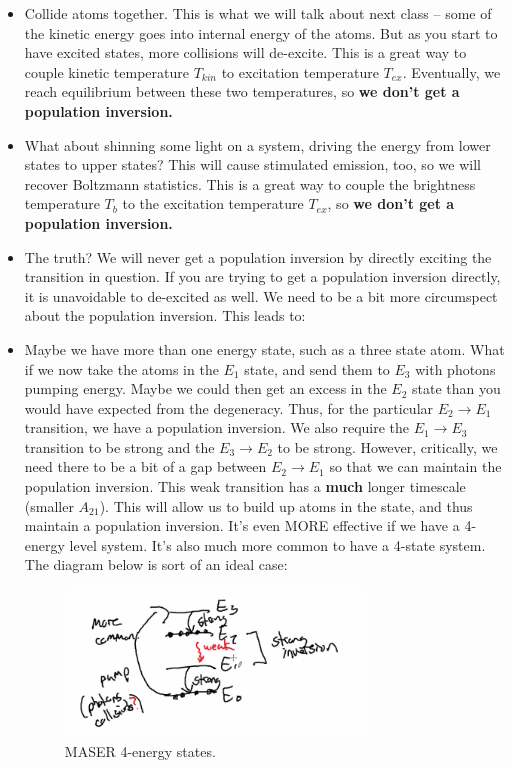 \documentclass{article}
\def\ato{{A_{21}}}
\def\ato{{A_{21}}}
\def\ato{{A_{21}}}
\begin{document}
\begin{itemize}
    \item Collide atoms together. This is what we will talk about next class -- some of the kinetic energy goes into internal energy of the atoms. But as you start to have excited states, more collisions will de-excite. This is a great way to couple kinetic temperature $T_{kin}$ to excitation temperature $T_{ex}$. Eventually, we reach equilibrium between these two temperatures, so \textbf{we don't get a population inversion.}
    
    \item What about shinning some light on a system, driving the energy from lower states to upper states? This will cause stimulated emission, too, so we will recover Boltzmann statistics. This is a great way to couple the brightness temperature $T_{b}$ to the excitation temperature $T_{ex}$, so \textbf{we don't get a population inversion.}
    
    \item The truth? We will never get a population inversion by directly exciting the transition in question. If you are trying to get a population inversion directly, it is unavoidable to de-excited as well. We need to be a bit more circumspect about the population inversion. This leads to:
    
    \item Maybe we have more than one energy state, such as a three state atom. What if we now take the atoms in the $E_1$ state, and send them to $E_3$ with photons pumping energy. Maybe we could then get an excess in the $E_2$ state than you would have expected from the degeneracy. Thus, for the particular $E_2\rightarrow E_1$ transition, we have a population inversion. We also require the $E_1\rightarrow E_3$ transition to be strong and the $E_3\rightarrow E_2$ to be strong. However, critically, we need there to be a bit of a gap between $E_2\rightarrow E_1$ so that we can maintain the population inversion. This weak transition has a \textbf{much} longer timescale (smaller $\ato$). This will allow us to build up atoms in the state, and thus maintain a population inversion. It's even MORE effective if we have a 4-energy level system. It's also much more common to have a 4-state system. The diagram below is sort of an ideal case: 
    
    \begin{figure}
        \centering
        \includegraphics[width=0.75\textwidth]{figures/Screen Shot 2020-10-06 at 12.13.06 PM.png}
        \caption{MASER 4-energy states.}
        \label{fig:inv}
    \end{figure}
    

\end{itemize}
\end{document}
